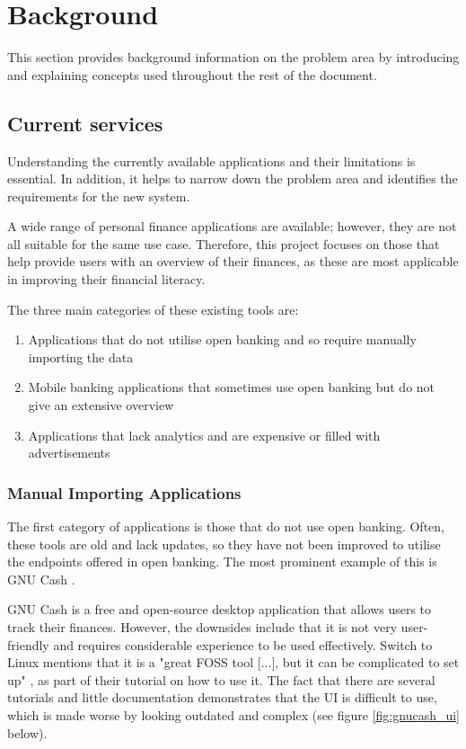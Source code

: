 \chapter{Background}
\label{ch:background}

This section provides background information on the problem area by introducing and explaining concepts used throughout the rest of the document.

\section{Current services}
\label{sec:current-services}
Understanding the currently available applications and their limitations is essential. In addition, it helps to narrow down the problem area and identifies the requirements for the new system.

A wide range of personal finance applications are available; however, they are not all suitable for the same use case. Therefore, this project focuses on those that help provide users with an overview of their finances, as these are most applicable in improving their financial literacy.

The three main categories of these existing tools are:
\begin{enumerate}
    \item Applications that do not utilise open banking and so require manually importing the data
    \item Mobile banking applications that sometimes use open banking but do not give an extensive overview
    \item Applications that lack analytics and are expensive or filled with advertisements
\end{enumerate}

\subsection{Manual Importing Applications}
\label{sec:manual-importing-applications}
The first category of applications is those that do not use open banking. Often, these tools are old and lack updates, so they have not been improved to utilise the endpoints offered in open banking. The most prominent example of this is GNU Cash \cite{GNUCash}.

GNU Cash is a free and open-source desktop application that allows users to track their finances. However, the downsides include that it is not very user-friendly and requires considerable experience to be used effectively. Switch to Linux mentions that it is a "great FOSS tool [...], but it can be complicated to set up" \cite{GNUCashSwitchedToLinux}, as part of their tutorial on how to use it. The fact that there are several tutorials and little documentation demonstrates that the UI is difficult to use, which is made worse by looking outdated and complex (see figure \ref{fig:gnucash_ui} below).

